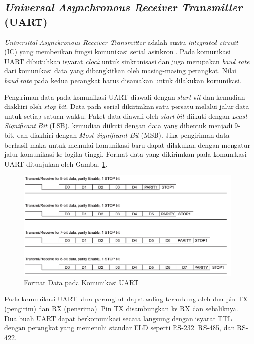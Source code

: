 \subsection{\textit{Universal Asynchronous Receiver Transmitter} (UART)}
\textit{Universital Asynchronous Receiver Transmitter} adalah suatu \textit{integrated circuit} (IC) yang memberikan fungsi komunikasi serial asinkron \cite{ti2010}. Pada komunikasi UART dibutuhkan isyarat \textit{clock} untuk sinkronisasi dan juga merupakan \textit{baud rate} dari komunikasi data yang dibangkitkan oleh masing-masing perangkat. Nilai \textit{baud rate} pada kedua perangkat harus disamakan untuk dilakukan komunikasi.

 Pengiriman data pada komunikasi UART diawali dengan \textit{start bit} dan kemudian diakhiri oleh \textit{stop bit}. Data pada serial dikirimkan satu persatu melalui jalur data untuk setiap satuan waktu. Paket data diawali oleh \textit{start bit} diikuti dengan \textit{Least Significant Bit} (LSB), kemudian diikuti dengan data yang dibentuk menjadi 9-bit, dan diakhiri dengan \textit{Most Significant Bit} (MSB). Jika pengiriman data berhasil maka untuk memulai komunikasi baru dapat dilakukan dengan mengatur jalur komunikasi ke logika tinggi. Format data yang dikirimkan pada komunikasi UART ditunjukan oleh Gambar \ref{Fig: uart-format}.

\begin{figure}[H]
	\centering
	\includegraphics[width=12cm]{contents/chapter-2/uart-format.png}
	\caption{Format Data pada Komunikasi UART \cite{ti2010}}
	\label{Fig: uart-format}
\end{figure}

Pada komunikasi UART, dua perangkat dapat saling terhubung oleh dua pin TX (pengirim) dan RX (penerima). Pin TX disambungkan ke RX dan sebaliknya. Dua buah UART dapat berkomunikasi secara langsung dengan isyarat TTL dengan perangkat yang memenuhi standar ELD seperti RS-232, RS-485, dan RS-422.

